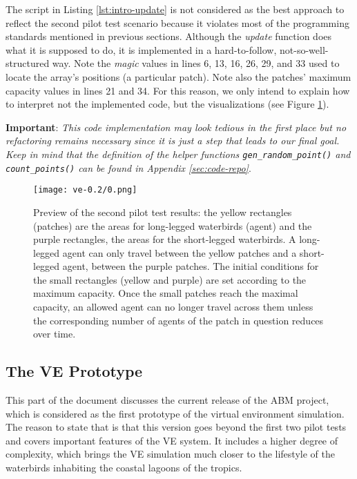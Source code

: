 
The script in Listing \ref{lst:intro-update} is not considered as the best approach to reflect the second pilot test scenario because it violates most of the programming standards mentioned in previous sections. Although the \emph{update} function does what it is supposed to do, it is implemented in a hard-to-follow, not-so-well-structured way. Note the \emph{magic} values in lines 6, 13, 16, 26, 29, and 33 used to locate the array's positions (a particular patch). Note also the patches' maximum capacity values in lines 21 and 34. For this reason, we only intend to explain how to interpret not the implemented code, but the visualizations (see Figure \ref{fig:pilot-test-2}).

\noindent
\textbf{Important}: \textit{This code implementation may look tedious in the first place but no refactoring remains necessary since it is just a step that leads to our final goal. Keep in mind that the definition of the helper functions \texttt{gen\_random\_point()} and \texttt{count\_points()} can be found in Appendix \ref{sec:code-repo}}.

\begin{figure}[h!]
    \centering
    \texttt{[image: ve-0.2/0.png]}
    \caption{Preview of the second pilot test results: the yellow rectangles (patches) are the areas for long-legged waterbirds (agent) and the purple rectangles, the areas for the short-legged waterbirds. A long-legged agent can only travel between the yellow patches and a short-legged agent, between the purple patches. The initial conditions for the small rectangles (yellow and purple) are set according to the maximum capacity. Once the small patches reach the maximal capacity, an allowed agent can no longer travel across them unless the corresponding number of agents of the patch in question reduces over time.}
    \label{fig:pilot-test-2}
\end{figure}

\subsection{The VE Prototype}
This part of the document discusses the current release of the ABM project, which is considered as the first prototype of the virtual environment simulation. The reason to state that is that this version goes beyond the first two pilot tests and covers important features of the VE system. It includes a higher degree of complexity, which brings the VE simulation much closer to the lifestyle of the waterbirds inhabiting the coastal lagoons of the tropics.

